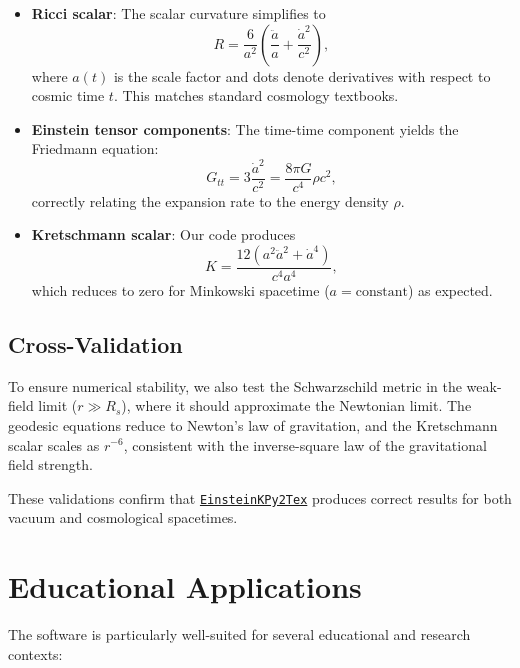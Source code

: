 \documentclass[11pt,a4paper]{article}
\begin{document}
\begin{itemize}
    \item \textbf{Ricci scalar}: The scalar curvature simplifies to
    \begin{equation}
    R = \frac{6}{a^2}\left(\frac{\ddot{a}}{a} + \frac{\dot{a}^2}{c^2}\right),
    \end{equation}
    where $a(t)$ is the scale factor and dots denote derivatives with respect to cosmic time $t$. This matches standard cosmology textbooks.
    
    \item \textbf{Einstein tensor components}: The time-time component yields the Friedmann equation:
    \begin{equation}
    G_{tt} = 3\frac{\dot{a}^2}{c^2} = \frac{8\pi G}{c^4} \rho c^2,
    \end{equation}
    correctly relating the expansion rate to the energy density $\rho$.
    
    \item \textbf{Kretschmann scalar}: Our code produces
    \begin{equation}
    K = \frac{12\left(a^2 \ddot{a}^2 + \dot{a}^4\right)}{c^4 a^4},
    \end{equation}
    which reduces to zero for Minkowski spacetime ($a = \text{constant}$) as expected.
\end{itemize}

\subsection{Cross-Validation}

To ensure numerical stability, we also test the Schwarzschild metric in the weak-field limit ($r \gg R_s$), where it should approximate the Newtonian limit. The geodesic equations reduce to Newton's law of gravitation, and the Kretschmann scalar scales as $r^{-6}$, consistent with the inverse-square law of the gravitational field strength.

These validations confirm that \href{https://github.com/lontelis/Einsteinpy_to_latex}{{\color{cyan}\texttt{EinsteinKPy2Tex}}} produces correct results for both vacuum and cosmological spacetimes.

\section{Educational Applications}

The software is particularly well-suited for several educational and research contexts:
\end{document}
